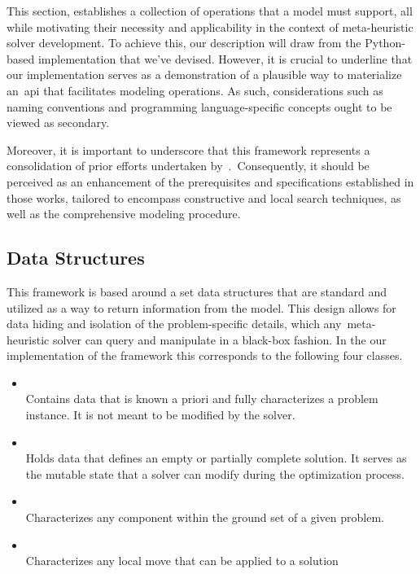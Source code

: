 This section, establishes a collection of operations that a model must
support, all while motivating their necessity and applicability in the
context of meta-heuristic solver development. To achieve this, our description
will draw from the Python-based implementation that we've devised. However, it is
crucial to underline that our implementation serves as a demonstration of a
plausible way to materialize an~\acrshort{api} that facilitates modeling
operations. As such, considerations such as naming conventions and programming
language-specific concepts ought to be viewed as secondary.

Moreover, it is important to underscore that this framework represents a
consolidation of prior efforts undertaken by~\citet{vieira2009uma,
  fonseca2021nasf4nio, outeiro2021application}.~Consequently, it should be
perceived as an enhancement of the prerequisites and specifications established
in those works, tailored to encompass constructive and local search techniques,
as well as the comprehensive modeling procedure.

\subsection{Data Structures}

This framework is based around a set data structures that are standard and
utilized as a way to return information from the model. This design allows for
data hiding and isolation of the problem-specific details, which
any~\acrshort{meta-heuristic} solver can query and manipulate in a black-box
fashion. In the our implementation of the framework this corresponds to the
following four classes.

\begin{itemize}
  \item {}\\
        Contains data that is known a priori and fully characterizes
        a problem instance. It is not meant to be modified by the solver.

  \item {}\\
        Holds data that defines an empty or partially
        complete solution. It serves as the mutable state that a solver can
        modify during the optimization process.

  \item {}\\
        Characterizes any component within the ground set of a given problem.

  \item {}\\
        Characterizes any local move that can be applied to a solution
\end{itemize}

